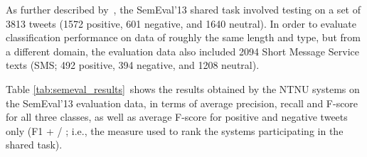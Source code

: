 As further described by~\citet{WilsonEA:13}, the SemEval'13 shared task involved testing on a set of 3813 tweets (1572 positive, 601 negative, and 1640 neutral). In order to evaluate classification performance on data of roughly the same length and type, but from a different domain, the evaluation data also included 2094 Short Message Service texts (SMS; 492 positive, 394 negative, and 1208 neutral).

Table \ref{tab:semeval_results}~shows the results obtained by the NTNU systems on the SemEval'13 evaluation data, in terms of average precision, recall and F-score for all three classes, as well as average F-score for positive and negative tweets only (F1 + / \textendash; i.e., the measure used to rank the systems participating in the shared task).
